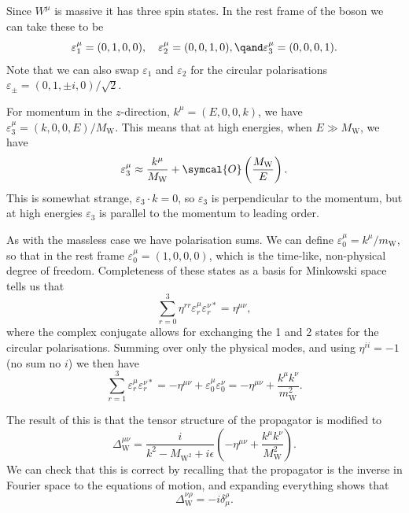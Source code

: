 \documentclass[fleqn]{NotesClass}
\newcommand{\Pparticle}[1]{\mathrm{#1}}
\newcommand{\PW}{\ensuremath{\Pparticle{W}}}
\newcommand{\order}{\symcal{O}}
\newcommand{\minkowskiMetric}{\eta}
\begin{document}
    Since \(W^\mu\) is massive it has three spin states.
    In the rest frame of the boson we can take these to be
    \begin{equation}
        \varepsilon_1^\mu = (0, 1, 0, 0), \quad \varepsilon_2^\mu = (0, 0, 1, 0), \qand \varepsilon_3^\mu = (0, 0, 0, 1).
    \end{equation}
    Note that we can also swap \(\varepsilon_1\) and \(\varepsilon_2\) for the circular polarisations \(\varepsilon_{\pm} = (0, 1, \pm i, 0)/\sqrt{2}\).
    
    For momentum in the \(z\)-direction, \(k^\mu = (E, 0, 0, k)\), we have \(\varepsilon_3^\mu = (k, 0, 0, E)/M_{\PW}\).
    This means that at high energies, when \(E \gg M_{\PW}\), we have
    \begin{equation}
        \varepsilon_3^\mu \approx \frac{k^\mu}{M_{\PW}} + \order\left( \frac{M_{\PW}}{E} \right).
    \end{equation}
    This is somewhat strange, \(\varepsilon_3 \cdot k = 0\), so \(\varepsilon_3\) is perpendicular to the momentum, but at high energies \(\varepsilon_3\) is parallel to the momentum to leading order.
    
    As with the massless case we have polarisation sums.
    We can define \(\varepsilon_0^\mu = k^\mu/m_{\PW}\), so that in the rest frame \(\varepsilon_0^\mu = (1, 0, 0, 0)\), which is the time-like, non-physical degree of freedom.
    Completeness of these states as a basis for Minkowski space tells us that
    \begin{equation}
        \sum_{r = 0}^{3} \minkowskiMetric^{rr} \varepsilon_r^\mu \varepsilon_r^{\nu*} = \minkowskiMetric^{\mu\nu},
    \end{equation}
    where the complex conjugate allows for exchanging the 1 and 2 states for the circular polarisations.
    Summing over only the physical modes, and using \(\minkowskiMetric^{ii} = -1\) (no sum no \(i\)) we then have
    \begin{equation}
        \sum_{r = 1}^{3} \varepsilon_r^\mu \varepsilon_r^{\nu*} = -\minkowskiMetric^{\mu\nu} + \varepsilon_0^\mu\varepsilon_0^{\nu} = -\minkowskiMetric^{\mu\nu} + \frac{k^\mu k^\nu}{m_{\PW}^2}.
    \end{equation}
    
    The result of this is that the tensor structure of the propagator is modified to
    \begin{equation}
        \Delta_{\PW}^{\mu\nu} = \frac{i}{k^2 - M_{\PW^2} + i\epsilon} \left( -\minkowskiMetric^{\mu\nu} + \frac{k^\mu k^\nu}{M_{\PW}^2} \right).
    \end{equation}
    We can check that this is correct by recalling that the propagator is the inverse in Fourier space to the equations of motion, and expanding everything shows that
    \begin{equation}
        [(-k^2 + M_{\PW}^2)\minkowskiMetric_{\mu\nu} + k_\mu k_\nu]\Delta_{\PW}^{\nu\rho} = -i\delta^\rho_\mu.
    \end{equation}
    
\end{document}
